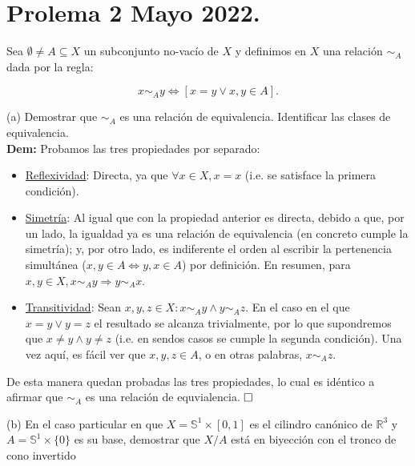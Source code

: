 \documentclass{article}
\begin{document}
\newpage

\section{Prolema 2 Mayo 2022.}

Sea $\emptyset \neq A \subseteq X$ un subconjunto no-vacío de $X$ y definimos en $X$ una relación $\sim_A$ dada por la regla: 

\[x \sim_A y \Longleftrightarrow [x = y \lor x, y \in A].\]

(a) Demostrar que $\sim_A$ es una relación de equivalencia. Identificar las clases de equivalencia. \\

\noindent\textbf{Dem:} Probamos las tres propiedades por separado:

\begin{itemize}
    \item \underline{Reflexividad}: Directa, ya que $\forall x \in X, x = x$ (i.e. se satisface la primera condición).

    \item \underline{Simetría}: Al igual que con la propiedad anterior es directa, debido a que, por un lado, la igualdad ya es una relación de equivalencia (en concreto cumple la simetría); y, por otro lado, es indiferente el orden al escribir la pertenencia simultánea ($x, y \in A \Longleftrightarrow y, x \in A$) por definición. En resumen, para $x, y \in X, x \sim_A y \Longrightarrow y \sim_A x$.

    \item \underline{Transitividad}: Sean $x, y, z \in X: x \sim_A y \land y \sim_A z$. En el caso en el que $x = y \lor y = z$ el resultado se alcanza trivialmente, por lo que supondremos que $x \neq y \land y \neq z$ (i.e. en sendos casos se cumple la segunda condición). Una vez aquí, es fácil ver que $x, y, z \in A$, o en otras palabras, $x \sim_A z$. 
\end{itemize}

De esta manera quedan probadas las tres propiedades, lo cual es idéntico a afirmar que $\sim_A$ es una relación de equvialencia. $\hfill\square$

\vspace{1cm}

\noindent (b) En el caso particular en que $X = \mathbb{S}^1 \times [0, 1]$ es el cilindro canónico de $\mathbb{R}^3$ y $A = \mathbb{S}^1 \times \{0\}$ es su base, demostrar que $X/A$ está en biyección con el tronco de cono invertido
\end{document}

